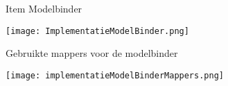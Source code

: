 \whitespace
\begin{graphic}
    \captionsetup{type=figure}
    \caption{Item Modelbinder}
    \texttt{[image: ImplementatieModelBinder.png]}
    \label{fig:Modelbinder}
\end{graphic}

\whitespace
\begin{graphic}
    \captionsetup{type=figure}
    \caption{Gebruikte mappers voor de modelbinder}
    \texttt{[image: implementatieModelBinderMappers.png]}
    \label{fig:ModelbinderMappers}
\end{graphic}
